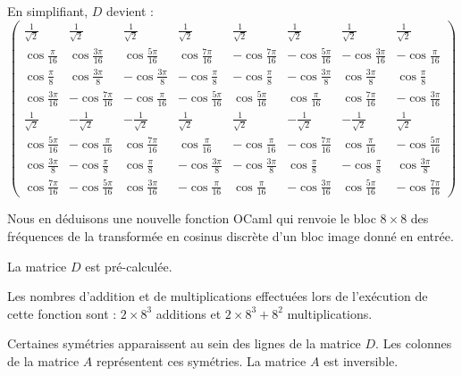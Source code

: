 En simplifiant, $D$ devient :
\[
\begin{pmatrix}
    \frac{1}{\sqrt2} & \frac{1}{\sqrt2} & \frac{1}{\sqrt2} & \frac{1}{\sqrt2} & \frac{1}{\sqrt2} & \frac{1}{\sqrt2} & \frac{1}{\sqrt2} & \frac{1}{\sqrt2} \\[6pt]
    \cos\frac{\pi}{16} & \cos\frac{3\pi}{16} & \cos\frac{5\pi}{16} & \cos\frac{7\pi}{16} & -\cos\frac{7\pi}{16} & -\cos\frac{5\pi}{16} & -\cos\frac{3\pi}{16} & -\cos\frac{\pi}{16} \\[6pt]
    \cos\frac{\pi}{8} & \cos\frac{3\pi}{8} & -\cos\frac{3\pi}{8} & -\cos\frac{\pi}{8} & -\cos\frac{\pi}{8} & -\cos\frac{3\pi}{8} & \cos\frac{3\pi}{8} & \cos\frac{\pi}{8} \\[6pt]
    \cos\frac{3\pi}{16} & -\cos\frac{7\pi}{16} & -\cos\frac{\pi}{16} & -\cos\frac{5\pi}{16} & \cos\frac{5\pi}{16} & \cos\frac{\pi}{16} & \cos\frac{7\pi}{16} & -\cos\frac{3\pi}{16} \\[6pt]
    \frac{1}{\sqrt2} & -\frac{1}{\sqrt2} & -\frac{1}{\sqrt2} & \frac{1}{\sqrt2} & \frac{1}{\sqrt2} & -\frac{1}{\sqrt2} & -\frac{1}{\sqrt2} & \frac{1}{\sqrt2} \\[6pt]
    \cos\frac{5\pi}{16} & -\cos\frac{\pi}{16} & \cos\frac{7\pi}{16} & \cos\frac{\pi}{16} & -\cos\frac{\pi}{16} & -\cos\frac{7\pi}{16} & \cos\frac{\pi}{16} & -\cos\frac{5\pi}{16} \\[6pt]
    \cos\frac{3\pi}{8} & -\cos\frac{\pi}{8} & \cos\frac{\pi}{8} & -\cos\frac{3\pi}{8} & -\cos\frac{3\pi}{8} & \cos\frac{\pi}{8} & -\cos\frac{\pi}{8} & \cos\frac{3\pi}{8} \\[6pt]
    \cos\frac{7\pi}{16} & -\cos\frac{5\pi}{16} & \cos\frac{3\pi}{16} & -\cos\frac{\pi}{16} & \cos\frac{\pi}{16} & -\cos\frac{3\pi}{16} & \cos\frac{5\pi}{16} & -\cos\frac{7\pi}{16}
\end{pmatrix}
\]

Nous en déduisons une nouvelle fonction OCaml qui renvoie le bloc $8 \times 8$ des fréquences de la transformée en cosinus discrète d'un bloc image donné en entrée.
\medskip

La matrice $D$ est pré-calculée.



Les nombres d'addition et de multiplications effectuées lors de l'exécution de cette fonction sont : $2 \times 8^3$ additions et $2 \times 8^3 + 8^2$ multiplications.

\Q
Certaines symétries apparaissent au sein des lignes de la matrice $D$. Les colonnes de la matrice $A$ représentent ces symétries. La matrice $A$ est inversible.
\medskip

